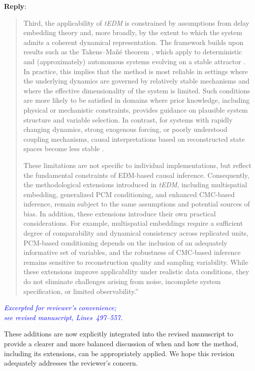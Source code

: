 \documentclass[11pt]{article}
\newcounter{reviewer}
\newenvironment{reply}
   {\medskip \noindent \color{blue} \begin{sf}\textbf{Reply}:\  }
   {\medskip \par \end{sf}}
\begin{document}
\begin{reply}
\begin{quote}
    Third, the applicability of \textit{tEDM} is constrained by assumptions from delay embedding theory and, more broadly, by the extent to which the system admits a coherent dynamical representation. The framework builds upon results such as the Takens--Ma{\~n}{\'e} theorem \citep{Takens1981embedding,Mane1981embedding}, which apply to deterministic and (approximately) autonomous systems evolving on a stable attractor \citep{leng2020pcm}. In practice, this implies that the method is most reliable in settings where the underlying dynamics are governed by relatively stable mechanisms and where the effective dimensionality of the system is limited. Such conditions are more likely to be satisfied in domains where prior knowledge, including physical or mechanistic constraints, provides guidance on plausible system structure and variable selection. In contrast, for systems with rapidly changing dynamics, strong exogenous forcing, or poorly understood coupling mechanisms, causal interpretations based on reconstructed state spaces become less stable \citep{butler2023discussion_of_ccm,park2023gobi}.
    
    These limitations are not specific to individual implementations, but reflect the fundamental constraints of EDM-based causal inference. Consequently, the methodological extensions introduced in \textit{tEDM}, including multispatial embedding, generalized PCM conditioning, and enhanced CMC-based inference, remain subject to the same assumptions and potential sources of bias. In addition, these extensions introduce their own practical considerations. For example, multispatial embeddings require a sufficient degree of comparability and dynamical consistency across replicated units, PCM-based conditioning depends on the inclusion of an adequately informative set of variables, and the robustness of CMC-based inference remains sensitive to reconstruction quality and sampling variability. While these extensions improve applicability under realistic data conditions, they do not eliminate challenges arising from noise, incomplete system specification, or limited observability.''
\end{quote}
\endgroup

\begin{flushright}
  {\footnotesize\textit{\textcolor{blue}{Excerpted for reviewer's convenience; \\
  see revised manuscript, Lines~497--557.}}}
\end{flushright}

\vspace{1em}

These additions are now explicitly integrated into the revised manuscript to provide a clearer and more balanced discussion of when and how the method, including its extensions, can be appropriately applied. We hope this revision adequately addresses the reviewer's concern.

\end{reply}
\end{document}
